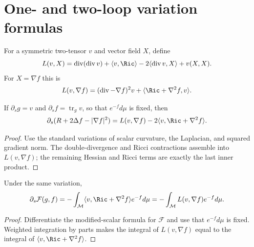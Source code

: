\section{One- and two-loop variation formulas}

\begin{definition}
\label{def:chow-iii-ch17-linear-trace-harnack}
For a symmetric two-tensor $v$ and vector field $X$, define
\[
 L(v,X)=\operatorname{div}(\operatorname{div}v)+\langle v,\Ric\rangle
 -2\langle\operatorname{div}v,X\rangle+v(X,X).
\]
For $X=\nabla f$ this is
\[
 L(v,\nabla f)=(\operatorname{div}-\nabla f)^2v
 +\langle\Ric+\nabla^2f,v\rangle.
\]
\end{definition}

\begin{lemma}
\label{lem:chow-iii-ch17-modified-scalar-variation}
If $\partial_sg=v$ and $\partial_sf=\operatorname{tr}_gv$, so that
$e^{-f}d\mu$ is fixed, then
\[
 \partial_s(R+2\Delta f-|\nabla f|^2)
 =L(v,\nabla f)-2\langle v,\Ric+\nabla^2f\rangle.
\]
\end{lemma}
\begin{proof}
\sketch Use the standard variations of scalar curvature, the Laplacian, and squared
gradient norm.  The double-divergence and Ricci contractions assemble into
$L(v,\nabla f)$; the remaining Hessian and Ricci terms are exactly the last
inner product.
\end{proof}

\begin{lemma}
\label{lem:chow-iii-ch17-perelman-energy-first-variation}
Under the same variation,
\[
 \partial_s\mathcal F(g,f)=-\int_{\mathcal M}
 \langle v,\Ric+\nabla^2f\rangle e^{-f}d\mu
 =-\int_{\mathcal M}L(v,\nabla f)e^{-f}d\mu.
\]
\end{lemma}
\begin{proof}
\sketch Differentiate the modified-scalar formula for $\mathcal F$ and use that
$e^{-f}d\mu$ is fixed.  Weighted integration by parts makes the integral of
$L(v,\nabla f)$ equal to the integral of
$\langle v,\Ric+\nabla^2f\rangle$.
\end{proof}

